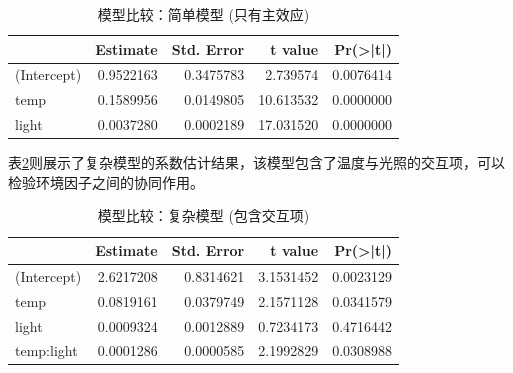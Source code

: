 \documentclass[
  twoside,12pt,fontset=none]{ctexbook}
\newenvironment{Shaded}{\begin{snugshade}}{\end{snugshade}}
\newcommand{\CommentTok}[1]{\textcolor[rgb]{0.56,0.35,0.01}{\textit{#1}}}
\newcommand{\FunctionTok}[1]{\textcolor[rgb]{0.13,0.29,0.53}{\textbf{#1}}}
\newcommand{\NormalTok}[1]{#1}
\newcommand{\OtherTok}[1]{\textcolor[rgb]{0.56,0.35,0.01}{#1}}
\newcommand{\SpecialCharTok}[1]{\textcolor[rgb]{0.81,0.36,0.00}{\textbf{#1}}}
\begin{document}
\begin{table}[!h]
\centering
\caption{\label{tab:nursery-model-simple-table}模型比较：简单模型 (只有主效应)}
\centering
\begin{tabular}[t]{lrrrr}
\toprule
  & Estimate & Std. Error & t value & Pr(>|t|)\\
\midrule
(Intercept) & 0.9522163 & 0.3475783 & 2.739574 & 0.0076414\\
temp & 0.1589956 & 0.0149805 & 10.613532 & 0.0000000\\
light & 0.0037280 & 0.0002189 & 17.031520 & 0.0000000\\
\bottomrule
\end{tabular}
\end{table}

表\ref{tab:nursery-model-complex-table}则展示了复杂模型的系数估计结果，该模型包含了温度与光照的交互项，可以检验环境因子之间的协同作用。

\begin{table}[!h]
\centering
\caption{\label{tab:nursery-model-complex-table}模型比较：复杂模型 (包含交互项)}
\centering
\begin{tabular}[t]{lrrrr}
\toprule
  & Estimate & Std. Error & t value & Pr(>|t|)\\
\midrule
(Intercept) & 2.6217208 & 0.8314621 & 3.1531452 & 0.0023129\\
temp & 0.0819161 & 0.0379749 & 2.1571128 & 0.0341579\\
light & 0.0009324 & 0.0012889 & 0.7234173 & 0.4716442\\
temp:light & 0.0001286 & 0.0000585 & 2.1992829 & 0.0308988\\
\bottomrule
\end{tabular}
\end{table}

\begin{Shaded}
\end{Shaded}
\end{document}
